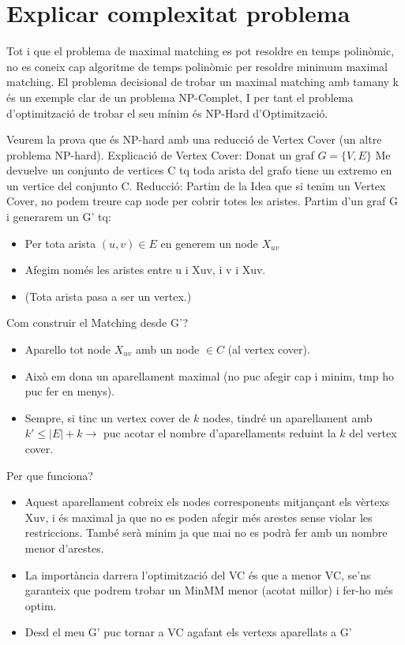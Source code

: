 \section{Explicar complexitat problema}
Tot i que el problema de maximal matching es pot resoldre en temps polinòmic, no es coneix cap algoritme de temps polinòmic per resoldre minimum maximal matching.
El problema decisional de trobar un maximal matching amb tamany k és un exemple clar de un problema NP-Complet, I per tant el problema d'optimització de trobar el seu mínim és NP-Hard d'Optimització.

Veurem la prova que és NP-hard amb una reducció de Vertex Cover (un altre problema NP-hard).
Explicació de Vertex Cover:
	Donat un graf $G = \{V,E\}$
	Me devuelve un conjunto de vertices C tq toda arista del grafo tiene un extremo en un vertice del conjunto C.
Reducció:
	Partim de la Idea que si tenim un Vertex Cover, no podem treure cap node per cobrir totes les aristes.
	Partim d'un graf G i generarem un G' tq:

\begin{itemize}
	\item Per tota arista $(u,v) \in E$ en generem un node $X_{uv}$
\item Afegim només les aristes entre u i Xuv, i v i Xuv.
\item (Tota arista pasa a ser un vertex.)
\end{itemize}

Com construir el Matching desde G'?

\begin{itemize}
	\item Aparello tot node $X_{uv}$ amb un node $\in C$ (al vertex cover).
\item Això em dona un aparellament maximal (no puc afegir cap i minim, tmp ho puc fer en menys).
	\item Sempre, si tinc un vertex cover de $k$ nodes, tindré un aparellament amb $k' \le |E| + k \rightarrow$ puc acotar el nombre d'aparellaments reduint la $k$ del vertex cover.
\end{itemize}

	Per que funciona?

\begin{itemize}
\item Aquest aparellament cobreix els nodes corresponents mitjançant els vèrtexs Xuv, i és maximal ja que no es poden afegir més arestes sense violar les restriccions. També serà minim ja que mai no es podrà fer amb un nombre menor d'arestes.
\item La importància darrera l'optimització del VC és que a menor VC, se'ns garanteix que podrem trobar un MinMM menor (acotat millor) i fer-ho més optim.
\item Desd el meu G' puc tornar a VC agafant els vertexs aparellats a G'
\end{itemize}

